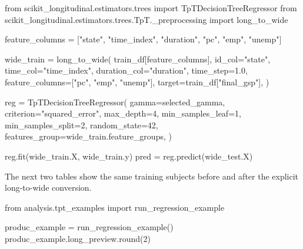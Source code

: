 \documentclass[
  letterpaper,
  DIV=11,
  numbers=noendperiod]{scrartcl}
\newenvironment{Shaded}{\begin{snugshade}}{\end{snugshade}}
\newcommand{\BuiltInTok}[1]{\textcolor[rgb]{0.00,0.23,0.31}{#1}}
\newcommand{\DecValTok}[1]{\textcolor[rgb]{0.68,0.00,0.00}{#1}}
\newcommand{\FloatTok}[1]{\textcolor[rgb]{0.68,0.00,0.00}{#1}}
\newcommand{\ImportTok}[1]{\textcolor[rgb]{0.00,0.46,0.62}{#1}}
\newcommand{\NormalTok}[1]{\textcolor[rgb]{0.00,0.23,0.31}{#1}}
\newcommand{\OperatorTok}[1]{\textcolor[rgb]{0.37,0.37,0.37}{#1}}
\newcommand{\StringTok}[1]{\textcolor[rgb]{0.13,0.47,0.30}{#1}}
\begin{document}
\begin{Shaded}
\begin{Highlighting}[]
\ImportTok{from}\NormalTok{ scikit\_longitudinal.estimators.trees }\ImportTok{import}\NormalTok{ TpTDecisionTreeRegressor}
\ImportTok{from}\NormalTok{ scikit\_longitudinal.estimators.trees.TpT.\_preprocessing }\ImportTok{import}\NormalTok{ long\_to\_wide}

\NormalTok{feature\_columns }\OperatorTok{=}\NormalTok{ [}\StringTok{"state"}\NormalTok{, }\StringTok{"time\_index"}\NormalTok{, }\StringTok{"duration"}\NormalTok{, }\StringTok{"pc"}\NormalTok{, }\StringTok{"emp"}\NormalTok{, }\StringTok{"unemp"}\NormalTok{]}

\NormalTok{wide\_train }\OperatorTok{=}\NormalTok{ long\_to\_wide(}
\NormalTok{    train\_df[feature\_columns],}
\NormalTok{    id\_col}\OperatorTok{=}\StringTok{"state"}\NormalTok{,}
\NormalTok{    time\_col}\OperatorTok{=}\StringTok{"time\_index"}\NormalTok{,}
\NormalTok{    duration\_col}\OperatorTok{=}\StringTok{"duration"}\NormalTok{,}
\NormalTok{    time\_step}\OperatorTok{=}\FloatTok{1.0}\NormalTok{,}
\NormalTok{    feature\_columns}\OperatorTok{=}\NormalTok{[}\StringTok{"pc"}\NormalTok{, }\StringTok{"emp"}\NormalTok{, }\StringTok{"unemp"}\NormalTok{],}
\NormalTok{    target}\OperatorTok{=}\NormalTok{train\_df[}\StringTok{"final\_gsp"}\NormalTok{],}
\NormalTok{)}

\NormalTok{reg }\OperatorTok{=}\NormalTok{ TpTDecisionTreeRegressor(}
\NormalTok{    gamma}\OperatorTok{=}\NormalTok{selected\_gamma,}
\NormalTok{    criterion}\OperatorTok{=}\StringTok{"squared\_error"}\NormalTok{,}
\NormalTok{    max\_depth}\OperatorTok{=}\DecValTok{4}\NormalTok{,}
\NormalTok{    min\_samples\_leaf}\OperatorTok{=}\DecValTok{1}\NormalTok{,}
\NormalTok{    min\_samples\_split}\OperatorTok{=}\DecValTok{2}\NormalTok{,}
\NormalTok{    random\_state}\OperatorTok{=}\DecValTok{42}\NormalTok{,}
\NormalTok{    features\_group}\OperatorTok{=}\NormalTok{wide\_train.feature\_groups,}
\NormalTok{)}

\NormalTok{reg.fit(wide\_train.X, wide\_train.y)}
\NormalTok{pred }\OperatorTok{=}\NormalTok{ reg.predict(wide\_test.X)}
\end{Highlighting}
\end{Shaded}

The next two tables show the same training subjects before and after the
explicit long-to-wide conversion.

\begin{Shaded}
\begin{Highlighting}[]
\ImportTok{from}\NormalTok{ analysis.tpt\_examples }\ImportTok{import}\NormalTok{ run\_regression\_example}

\NormalTok{produc\_example }\OperatorTok{=}\NormalTok{ run\_regression\_example()}
\NormalTok{produc\_example.long\_preview.}\BuiltInTok{round}\NormalTok{(}\DecValTok{2}\NormalTok{)}
\end{Highlighting}
\end{Shaded}
\end{document}
